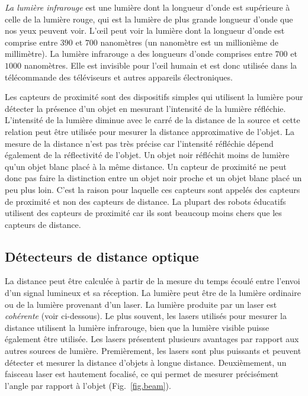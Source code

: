\emph{La lumière infrarouge} est une lumière dont la longueur d'onde est supérieure à celle de la lumière rouge, qui est la lumière de plus grande longueur d'onde que nos yeux peuvent voir. L'œil peut voir la lumière dont la longueur d'onde est comprise entre $390$ et $700$ nanomètres (un nanomètre est un millionième de millimètre). La lumière infrarouge a des longueurs d'onde comprises entre $700$ et $1000$ nanomètres. Elle est invisible pour l'œil humain et est donc utilisée dans la télécommande des téléviseurs et autres appareils électroniques.

Les capteurs de proximité sont des dispositifs simples qui utilisent la lumière pour détecter la présence d'un objet en mesurant l'intensité de la lumière réfléchie. L'intensité de la lumière diminue avec le carré de la distance de la source et cette relation peut être utilisée pour mesurer la distance approximative de l'objet. La mesure de la distance n'est pas très précise car l'intensité réfléchie dépend également de la réflectivité de l'objet. Un objet noir réfléchit moins de lumière qu'un objet blanc placé à la même distance. Un capteur de proximité ne peut donc pas faire la distinction entre un objet noir proche et un objet blanc placé un peu plus loin. C'est la raison pour laquelle ces capteurs sont appelés des capteurs de proximité et non des capteurs de distance. La plupart des robots éducatifs utilisent des capteurs de proximité car ils sont beaucoup moins chers que les capteurs de distance.

\subsection{Détecteurs de distance optique}\label{s.distance optique}

La distance peut être calculée à partir de la mesure du temps écoulé entre l'envoi d'un signal lumineux et sa réception. La lumière peut être de la lumière ordinaire ou de la lumière provenant d'un laser. La lumière produite par un laser est \emph{cohérente} (voir ci-dessous).  Le plus souvent, les lasers utilisés pour mesurer la distance utilisent la lumière infrarouge, bien que la lumière visible puisse également être utilisée. Les lasers présentent plusieurs avantages par rapport aux autres sources de lumière. Premièrement, les lasers sont plus puissants et peuvent détecter et mesurer la distance d'objets à longue distance. Deuxièmement, un faisceau laser est hautement focalisé, ce qui permet de mesurer précisément l'angle par rapport à l'objet (Fig.~\ref{fig.beam}).

